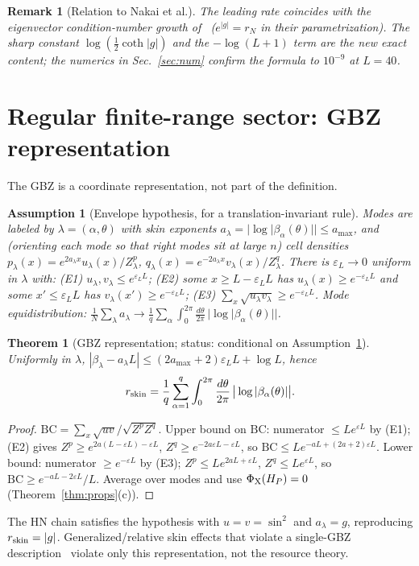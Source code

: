 \documentclass[11pt]{article}
\newtheorem{theorem}{Theorem}
\newtheorem{remark}{Remark}
\newtheorem{assumption}{Assumption}
\newcommand{\rskin}{r_{\rm skin}}
\newcommand{\PhiX}{\Phi_{\rm X}}
\newcommand{\BC}{\mathrm{BC}}
\begin{document}
\begin{remark}[Relation to Nakai et al.]
The leading rate coincides with the eigenvector condition-number growth of~\cite{Nakai} ($e^{|g|}=r_N$ in their parametrization). The sharp constant $\log(\frac12\coth|g|)$ and the $-\log(L+1)$ term are the new exact content; the numerics in Sec.~\ref{sec:num} confirm the formula to $10^{-9}$ at $L=40$.
\end{remark}

\section{Regular finite-range sector: GBZ representation}
The GBZ is a coordinate representation, not part of the definition.
\begin{assumption}[Envelope hypothesis, for a translation-invariant rule]\label{ass:env}
Modes are labeled by $\lambda=(\alpha,\theta)$ with skin exponents $a_\lambda=|\log|\beta_\alpha(\theta)||\le a_{\max}$, and (orienting each mode so that right modes sit at large $n$) cell densities $p_\lambda(x)=e^{2a_\lambda x}u_\lambda(x)/Z^p_\lambda$, $q_\lambda(x)=e^{-2a_\lambda x}v_\lambda(x)/Z^q_\lambda$. There is $\varepsilon_L\to0$ uniform in $\lambda$ with: (E1) $u_\lambda,v_\lambda\le e^{\varepsilon_LL}$; (E2) some $x\ge L-\varepsilon_LL$ has $u_\lambda(x)\ge e^{-\varepsilon_LL}$ and some $x'\le\varepsilon_LL$ has $v_\lambda(x')\ge e^{-\varepsilon_LL}$; (E3) $\sum_x\sqrt{u_\lambda v_\lambda}\ge e^{-\varepsilon_LL}$. Mode equidistribution: $\frac1N\sum_\lambda a_\lambda\to\frac1q\sum_\alpha\int_0^{2\pi}\frac{d\theta}{2\pi}\,|\log|\beta_\alpha(\theta)||$.
\end{assumption}
\begin{theorem}[GBZ representation; status: conditional on Assumption~\ref{ass:env}]\label{thm:gbz}
Uniformly in $\lambda$, $|\beta_\lambda-a_\lambda L|\le(2a_{\max}+2)\varepsilon_LL+\log L$, hence
\[
\rskin=\frac1q\sum_{\alpha=1}^q\int_0^{2\pi}\frac{d\theta}{2\pi}\,\big|\log|\beta_\alpha(\theta)|\big|.
\]
\end{theorem}
\begin{proof}
$\BC=\sum_x\sqrt{u v}/\sqrt{Z^pZ^q}$. Upper bound on $\BC$: numerator $\le Le^{\varepsilon L}$ by (E1); (E2) gives $Z^p\ge e^{2a(L-\varepsilon L)-\varepsilon L}$, $Z^q\ge e^{-2a\varepsilon L-\varepsilon L}$, so $\BC\le Le^{-aL+(2a+2)\varepsilon L}$. Lower bound: numerator $\ge e^{-\varepsilon L}$ by (E3); $Z^p\le Le^{2aL+\varepsilon L}$, $Z^q\le Le^{\varepsilon L}$, so $\BC\ge e^{-aL-2\varepsilon L}/L$. Average over modes and use $\PhiX(H_P)=0$ (Theorem~\ref{thm:props}(c)).
\end{proof}
The HN chain satisfies the hypothesis with $u=v=\sin^2$ and $a_\lambda=g$, reproducing $\rskin=|g|$. Generalized/relative skin effects that violate a single-GBZ description~\cite{Wei} violate only this representation, not the resource theory.
\end{document}

